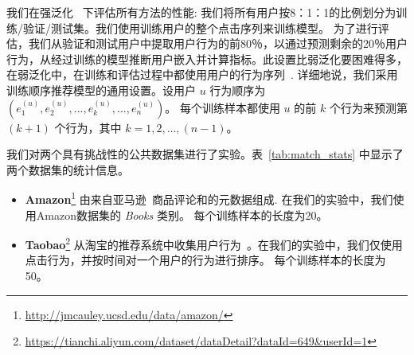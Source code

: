 我们在强泛化~\cite{marlin2004collaborative, liang2018variational, ma2019learning} 下评估所有方法的性能: 我们将所有用户按8：1：1的比例划分为训练/验证/测试集。我们使用训练用户的整个点击序列来训练模型。 为了进行评估，我们从验证和测试用户中提取用户行为的前80％，以通过预测剩余的20％用户行为，从经过训练的模型推断用户嵌入并计算指标。此设置比弱泛化要困难得多，在弱泛化中，在训练和评估过程中都使用用户的行为序列~\cite{liang2018variational}.
详细地说，我们采用训练顺序推荐模型的通用设置。设用户 $u$ 行为顺序为 $(e_1^{(u)}, e_2^{(u)}, ..., e_k^{(u)}, ..., e_n^{(u)})$。 每个训练样本都使用 $u$ 的前 $k$ 个行为来预测第 $(k+1)$ 个行为，其中 $k=1,2,...,(n-1)$。

 我们对两个具有挑战性的公共数据集进行了实验。表~\ref{tab:match_stats} 中显示了两个数据集的统计信息。

\begin{itemize}
    \item \textbf{Amazon}\footnote{\url{http://jmcauley.ucsd.edu/data/amazon/}} 由来自亚马逊~\cite{mcauley2015image,he2016ups}商品评论和的元数据组成. 在我们的实验中，我们使用Amazon数据集的 \textit{Books} 类别。 每个训练样本的长度为20。
    \item \textbf{Taobao}\footnote{\url{https://tianchi.aliyun.com/dataset/dataDetail?dataId=649\&userId=1}} 从淘宝的推荐系统中收集用户行为~\cite{zhu2018learning}。在我们的实验中，我们仅使用点击行为，并按时间对一个用户的行为进行排序。 每个训练样本的长度为50。
\end{itemize}

